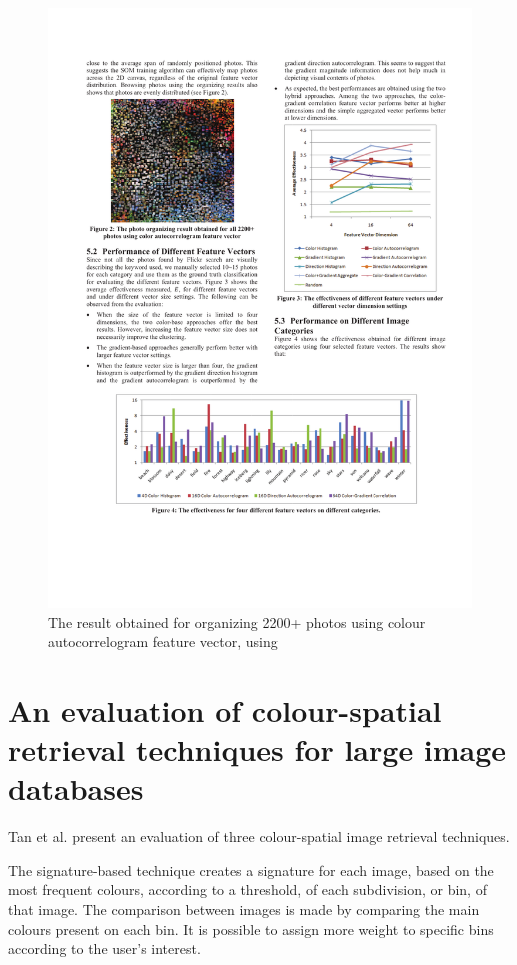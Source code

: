 \begin{figure}[ht]
	\centering
		\includegraphics[scale=1]{imgs/Strong1}
	\caption{The result obtained for organizing 2200+ photos using colour autocorrelogram feature vector, using \cite{Strong:2009p413}}
	\label{fig:Strong1}
\end{figure}


\newpage
\section{An evaluation of colour-spatial retrieval techniques for large image databases} %
\label{sub:Tan}

Tan et al. \cite{Tan:2001p850} present an evaluation of three colour-spatial image retrieval techniques.

The signature-based technique creates a signature for each image, based on the most frequent colours, according to a threshold, of each subdivision, or bin, of that image. The comparison between images is made by comparing the main colours present on each bin. It is possible to assign more weight to specific bins according to the user's interest.

